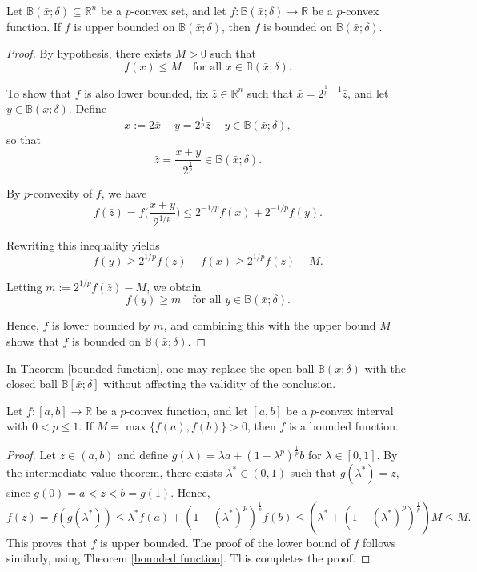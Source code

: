 \documentclass[10pt]{article}
\begin{document}
\begin{theorem}
Let $\mathbb{B}(\bar{x};\delta) \subseteq \mathbb{R}^{n}$ be a $p$-convex set, and let $f\colon \mathbb{B}(\bar{x};\delta) \to \mathbb{R}$ be a $p$-convex function. If $f$ is upper bounded on $\mathbb{B}(\bar{x};\delta)$, then $f$ is bounded on $\mathbb{B}(\bar{x};\delta)$.
\label{bounded function}
\end{theorem}

\begin{proof}
By hypothesis, there exists $M>0$ such that
\[
f(x) \leq M \quad \text{for all } x \in \mathbb{B}(\bar{x};\delta).
\]

To show that $f$ is also lower bounded, fix $\bar{z} \in \mathbb{R}^n$ such that $\bar{x} = 2^{\frac{1}{p}-1} \bar{z}$, and let $y \in \mathbb{B}(\bar{x};\delta)$. Define 
\[
x := 2\bar{x} - y = 2^{\frac{1}{p}} \bar{z} - y \in \mathbb{B}(\bar{x};\delta),
\]
so that 
\[
\bar{z} = \frac{x + y}{2^{\frac{1}{p}}} \in \mathbb{B}(\bar{x};\delta).
\]

By $p$-convexity of $f$, we have
\[
f(\bar{z}) = f\Big( \frac{x + y}{2^{1/p}} \Big) \leq 2^{-1/p} f(x) + 2^{-1/p} f(y).
\]

Rewriting this inequality yields
\[
f(y) \geq 2^{1/p} f(\bar{z}) - f(x) \geq 2^{1/p} f(\bar{z}) - M.
\]

Letting $m := 2^{1/p} f(\bar{z}) - M$, we obtain
\[
f(y) \geq m \quad \text{for all } y \in \mathbb{B}(\bar{x};\delta).
\]

Hence, $f$ is lower bounded by $m$, and combining this with the upper bound $M$ shows that $f$ is bounded on $\mathbb{B}(\bar{x};\delta)$.
\end{proof}

\begin{remark}
In Theorem \ref{bounded function}, one may replace the open ball $\mathbb{B}(\bar{x};\delta)$ with the closed ball $\mathbb{B}[\bar{x};\delta]$ without affecting the validity of the conclusion.
\end{remark}

 \begin{corollary}
Let $f:[a,b] \rightarrow \mathbb{R}$ be a $p$-convex function, and let $[a,b]$ be a $p$-convex interval with $0 < p \leq 1$. If $M = \max\{f(a),f(b)\} > 0$, then $f$ is a bounded function.
\end{corollary}

\begin{proof}
Let $z \in (a,b)$ and define $g(\lambda) = \lambda a + (1-\lambda^{p})^{\frac{1}{p}} b$ for $\lambda \in [0,1]$. By the intermediate value theorem, there exists $\lambda^{\ast} \in (0,1)$ such that $g(\lambda^{\ast}) = z$, since $g(0) = a < z < b = g(1)$. Hence, 
\[
f(z) = f(g(\lambda^{\ast})) \leq \lambda^{\ast} f(a) + (1-(\lambda^{\ast})^{p})^{\frac{1}{p}} f(b) \leq (\lambda^{\ast} + (1-(\lambda^{\ast})^{p})^{\frac{1}{p}}) M \leq M.
\]
This proves that $f$ is upper bounded. The proof of the lower bound of $f$ follows similarly, using Theorem \ref{bounded function}. This completes the proof.
\end{proof}
 
\end{document}
